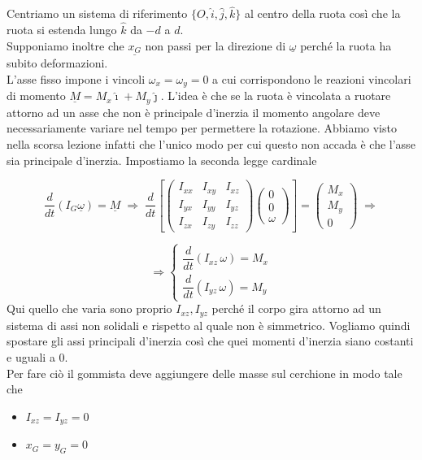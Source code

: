 Centriamo un sistema di riferimento \(\{O,\hat{i},\hat{j},\hat{k}\}\) al centro della ruota così che la ruota si estenda lungo \(\hat{k}\) da \(-d\) a \(d\).\\
Supponiamo inoltre che \(\underline{x_G}\) non passi per la direzione di \(\underline{\omega}\) perché la ruota ha subito deformazioni.\\
L'asse fisso impone i vincoli \(\omega_x=\omega_y=0\) a cui corrispondono le reazioni vincolari di momento \(\underline{M}=M_x\hat{\imath}+M_y\hat{\jmath}\). L'idea è che se la ruota è vincolata a ruotare attorno ad un asse che non è principale d'inerzia il momento angolare deve necessariamente variare nel tempo per permettere la rotazione. Abbiamo visto nella scorsa lezione infatti che l'unico modo per cui questo non accada è che l'asse sia principale d'inerzia. Impostiamo la seconda legge cardinale

\[
\frac{d}{dt}\left(I_G\underline{\omega}\right)=\underline{M}
\;\Rightarrow\;
\frac{d}{dt}\left[
\begin{pmatrix}
I_{xx} & I_{xy} & I_{xz} \\
I_{yx} & I_{yy} & I_{yz} \\
I_{zx} & I_{zy} & I_{zz}
\end{pmatrix}
\begin{pmatrix}
0 \\
0 \\
\omega
\end{pmatrix}
\right]
=
\begin{pmatrix}
M_x \\
M_y \\
0
\end{pmatrix}
\;\Rightarrow
\]

\[
\Rightarrow
\begin{cases}
\dfrac{d}{dt}\left(I_{xz}\,\omega\right)=M_x \\[1ex]
\dfrac{d}{dt}\left(I_{yz}\,\omega\right)=M_y
\end{cases}
\]
Qui quello che varia sono proprio $I_{xz}, I_{yz}$ perché il corpo gira attorno ad un sistema di assi non solidali e rispetto al quale non è simmetrico. Vogliamo quindi spostare gli assi principali d'inerzia così che quei momenti d'inerzia siano costanti e uguali a 0.\\
Per fare ciò il gommista deve aggiungere delle masse sul cerchione in modo tale che

\begin{itemize}
\item \(I_{xz}=I_{yz}=0\)
\item \(x_G=y_G=0\)
\end{itemize}

